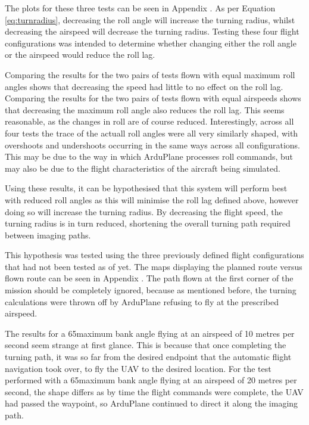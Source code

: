 
The plots for these three tests can be seen in Appendix %
. As per Equation \ref{eq:turnradius}, decreasing the roll angle will increase the turning radius, whilst decreasing the airspeed will decrease the turning radius. Testing these four flight configurations was intended to determine whether changing either the roll angle or the airspeed would reduce the roll lag. 

Comparing the results for the two pairs of tests flown with equal maximum roll angles shows that decreasing the speed had little to no effect on the roll lag. Comparing the results for the two pairs of tests flown with equal airspeeds shows that decreasing the maximum roll angle also reduces the roll lag. This seems reasonable, as the changes in roll are of course reduced. Interestingly, across all four tests the trace of the actuall roll angles were all very similarly shaped, with overshoots and undershoots occurring in the same ways across all configurations. This may be due to the way in which ArduPlane processes roll commands, but may also be due to the flight characteristics of the aircraft being simulated.


Using these results, it can be hypothesised that this system will perform best with reduced roll angles as this will minimise the roll lag defined above, however doing so will increase the turning radius. By decreasing the flight speed, the turning radius is in turn reduced, shortening the overall turning path required between imaging paths. 

This hypothesis was tested using the three previously defined flight configurations that had not been tested as of yet. The maps displaying the planned route versus flown route can be seen in Appendix %
. The path flown at the first corner of the mission should be completely ignored, because as mentioned before, the turning calculations were thrown off by ArduPlane refusing to fly at the prescribed airspeed. 

The results for a 65\degree maximum bank angle flying at an airspeed of 10 metres per second seem strange at first glance. This is because that once completing the turning path, it was so far from the desired endpoint that the automatic flight navigation took over, to fly the UAV to the desired location. For the test performed with a 65\degree maximum bank angle flying at an airspeed of 20 metres per second, the shape differs as by time the flight commands were complete, the UAV had passed the waypoint, so ArduPlane continued to direct it along the imaging path. 

